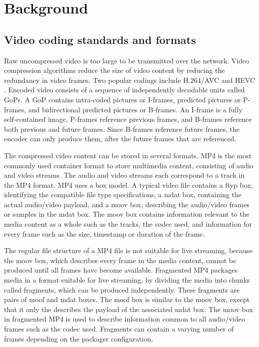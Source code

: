 
\chapter{Background}\label{chapter:background}

\section{Video coding standards and formats}
Raw uncompressed video is too large to be transmitted over the network. Video compression algorithms reduce the size of video content by reducing the redundancy in video frames. Two popular codings include H.264/AVC \parencite{wiegandOverview264AVC2003} and HEVC \parencite{sullivanOverviewHighEfficiency2012}. Encoded video consists of a sequence of independently decodable units called \acp{GoP}. A \ac{GoP} contains intra-coded pictures or I-frames, predicted pictures or P-frames, and bidirectional predicted pictures or B-frames. An I-frame is a fully self-contained image, P-frames reference previous frames, and B-frames reference both previous and future frames. Since B-frames reference future frames, the encoder can only produce them, after the future frames that are referenced.


The compressed video content can be stored in several formats. MP4 is the most commonly used container format to store multimedia content, consisting of audio and video streams. The audio and video streams each correspond to a track in the MP4 format. MP4 uses a box model. A typical video file contains a ftyp box, identifying the compatible file type specifications, a mdat box, containing the actual audio/video payload, and a moov box, describing the audio/video frames or samples in the mdat box. The moov box contains information relevant to the media content as a whole such as the tracks, the codec used, and information for every frame such as the size, timestamp or duration of the frame.

The regular file structure of a MP4 file is not suitable for live streaming, because the moov box, which describes every frame in the media content, cannot be produced until all frames have become available. Fragmented MP4 packages media in a format suitable for live streaming, by dividing the media into chunks called fragments, which can be produced independently. These fragments are pairs of moof and mdat boxes. The moof box is similar to the moov box, except that it only the describes the payload of the associated mdat box. The moov box in fragmented MP4 is used to describe information common to all audio/video frames such as the codec used. Fragments can contain a varying number of frames depending on the packager configuration.

